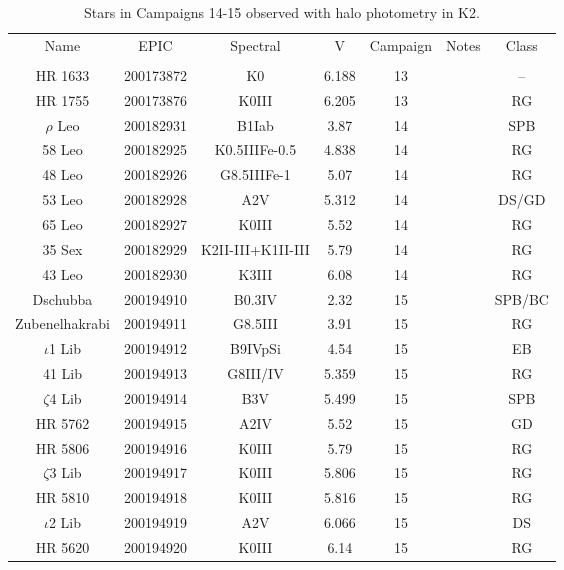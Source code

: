 \begin{table*}
\caption{Stars in Campaigns 14-15 observed with halo photometry in K2.\label{table_4}}
\begin{tabular}{ccccccc}
\hline \hline
Name & EPIC & Spectral & V & Campaign & Notes & Class \\
 &  &  &  &  &  &  \\
\hline
HR 1633 & 200173872 & K0 & 6.188 & 13 &  & -- \\
HR 1755 & 200173876 & K0III & 6.205 & 13 &  & RG \\
$\rho$ Leo & 200182931 & B1Iab & 3.87 & 14 & \tablenotemark{e} & SPB \\
58 Leo & 200182925 & K0.5IIIFe-0.5 & 4.838 & 14 &  & RG \\
48 Leo & 200182926 & G8.5IIIFe-1 & 5.07 & 14 &  & RG \\
53 Leo & 200182928 & A2V & 5.312 & 14 &  & DS/GD \\
65 Leo & 200182927 & K0III & 5.52 & 14 &  & RG \\
35 Sex & 200182929 & K2II-III+K1II-III & 5.79 & 14 &  & RG \\
43 Leo & 200182930 & K3III & 6.08 & 14 &  & RG \\
Dschubba & 200194910 & B0.3IV & 2.32 & 15 &  & SPB/BC \\
Zubenelhakrabi & 200194911 & G8.5III & 3.91 & 15 &  & RG \\
$\iota$1 Lib & 200194912 & B9IVpSi & 4.54 & 15 & \tablenotemark{b} & EB \\
41 Lib & 200194913 & G8III/IV & 5.359 & 15 &  & RG \\
$\zeta$4 Lib & 200194914 & B3V & 5.499 & 15 &  & SPB \\
HR 5762 & 200194915 & A2IV & 5.52 & 15 &  & GD \\
HR 5806 & 200194916 & K0III & 5.79 & 15 &  & RG \\
$\zeta$3 Lib & 200194917 & K0III & 5.806 & 15 &  & RG \\
HR 5810 & 200194918 & K0III & 5.816 & 15 &  & RG \\
$\iota$2 Lib & 200194919 & A2V & 6.066 & 15 & \tablenotemark{b} & DS \\
HR 5620 & 200194920 & K0III & 6.14 & 15 &  & RG \\
\hline
\end{tabular}
\end{table*}
